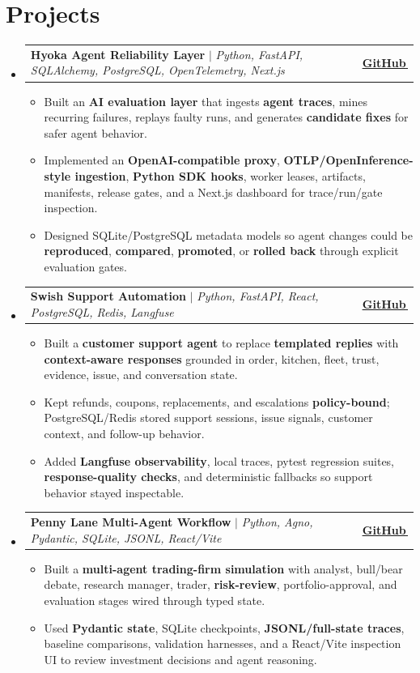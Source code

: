 \documentclass[letterpaper,11pt]{article}
\makeatletter
\newcommand{\bodyhref}[2]{\href{#1}{\underline{#2}\,\faExternalLink*}}
\newcommand{\resumeItem}[1]{\item{\fontsize{9.1pt}{9.8pt}\selectfont #1\vspace{0.2pt}}}
\newcommand{\resumeProjectHeading}[2]{
    \item
    \begin{tabular*}{1.0\textwidth}{l@{\extracolsep{\fill}}r}
      \small#1 & \textbf{\small #2}\\
    \end{tabular*}\vspace{-2pt}
}
\newcommand{\resumeSubHeadingListStart}{\begin{itemize}[leftmargin=0.0in, label={}, itemsep=2pt, topsep=1pt, parsep=0pt, partopsep=0pt]}
\newcommand{\resumeSubHeadingListEnd}{\end{itemize}}
\newcommand{\resumeItemListStart}{\begin{itemize}[leftmargin=0.16in,itemsep=1.25pt,topsep=1.2pt,parsep=0pt,partopsep=0pt]}
\newcommand{\resumeItemListEnd}{\end{itemize}\vspace{-1pt}}
\makeatother
\begin{document}
\section{Projects}
\resumeSubHeadingListStart
\resumeProjectHeading
{\textbf{Hyoka Agent Reliability Layer} $|$ \emph{Python, FastAPI, SQLAlchemy, PostgreSQL, OpenTelemetry, Next.js}}{\bodyhref{https://github.com/unichronic/hyoka}{GitHub}}
\resumeItemListStart
\resumeItem{Built an \textbf{AI evaluation layer} that ingests \textbf{agent traces}, mines recurring failures, replays faulty runs, and generates \textbf{candidate fixes} for safer agent behavior.}
\resumeItem{Implemented an \textbf{OpenAI-compatible proxy}, \textbf{OTLP/OpenInference-style ingestion}, \textbf{Python SDK hooks}, worker leases, artifacts, manifests, release gates, and a Next.js dashboard for trace/run/gate inspection.}
\resumeItem{Designed SQLite/PostgreSQL metadata models so agent changes could be \textbf{reproduced}, \textbf{compared}, \textbf{promoted}, or \textbf{rolled back} through explicit evaluation gates.}
\resumeItemListEnd
\resumeProjectHeading
{\textbf{Swish Support Automation} $|$ \emph{Python, FastAPI, React, PostgreSQL, Redis, Langfuse}}{\bodyhref{https://github.com/unichronic/swishagent}{GitHub}}
\resumeItemListStart
\resumeItem{Built a \textbf{customer support agent} to replace \textbf{templated replies} with \textbf{context-aware responses} grounded in order, kitchen, fleet, trust, evidence, issue, and conversation state.}
\resumeItem{Kept refunds, coupons, replacements, and escalations \textbf{policy-bound}; PostgreSQL/Redis stored support sessions, issue signals, customer context, and follow-up behavior.}
\resumeItem{Added \textbf{Langfuse observability}, local traces, pytest regression suites, \textbf{response-quality checks}, and deterministic fallbacks so support behavior stayed inspectable.}
\resumeItemListEnd
\resumeProjectHeading
{\textbf{Penny Lane Multi-Agent Workflow} $|$ \emph{Python, Agno, Pydantic, SQLite, JSONL, React/Vite}}{\bodyhref{https://github.com/unichronic/pennylane}{GitHub}}
\resumeItemListStart
\resumeItem{Built a \textbf{multi-agent trading-firm simulation} with analyst, bull/bear debate, research manager, trader, \textbf{risk-review}, portfolio-approval, and evaluation stages wired through typed state.}
\resumeItem{Used \textbf{Pydantic state}, SQLite checkpoints, \textbf{JSONL/full-state traces}, baseline comparisons, validation harnesses, and a React/Vite inspection UI to review investment decisions and agent reasoning.}
\resumeItemListEnd
\resumeSubHeadingListEnd
\end{document}
